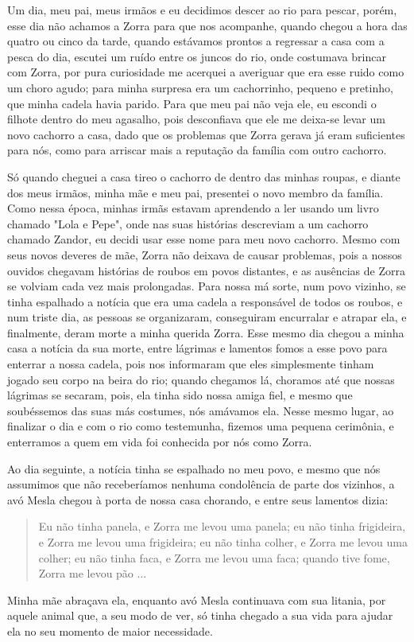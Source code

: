 Um dia, meu pai, meus irmãos e eu decidimos descer ao rio para pescar, porém, esse dia não achamos a Zorra para que nos acompanhe, quando chegou a hora das quatro ou cinco da tarde, quando estávamos prontos a regressar a casa com a pesca do dia, escutei um ruído entre os juncos do rio, onde costumava brincar com Zorra, por pura curiosidade me acerquei a averiguar que era esse ruido como um choro agudo; para minha surpresa era um cachorrinho, pequeno e pretinho, que minha cadela havia parido.  
Para que meu pai não veja ele, eu escondi o filhote dentro do meu agasalho, pois desconfiava que ele me deixa-se levar um novo cachorro a casa, dado que os problemas que Zorra gerava já eram suficientes para nós, como para arriscar mais a reputação da família com outro cachorro.

Só quando cheguei a casa tireo o cachorro de dentro das minhas roupas, e diante dos meus irmãos, minha mãe e meu pai, presentei o novo membro da família. Como nessa época, minhas irmãs estavam aprendendo a ler usando um livro chamado "Lola e Pepe", onde nas suas histórias descreviam a um cachorro chamado Zandor, eu decidi usar esse nome para meu novo cachorro. 
Mesmo com seus novos deveres de mãe, Zorra não deixava de causar problemas, pois a nossos ouvidos chegavam histórias de roubos em povos distantes, e as ausências de Zorra se volviam cada vez mais prolongadas.
Para nossa má sorte, num povo vizinho, se tinha espalhado a notícia que era uma cadela a responsável de todos os roubos, e num triste dia, as pessoas se organizaram, conseguiram encurralar e atrapar ela, e finalmente, deram morte a minha querida Zorra.
Esse mesmo dia chegou a minha casa a notícia da sua morte, entre lágrimas e lamentos fomos a esse povo para enterrar a nossa cadela, pois nos informaram que eles simplesmente tinham jogado seu corpo na beira do rio; quando chegamos lá, choramos até que nossas lágrimas se secaram, pois, ela tinha sido nossa amiga fiel, e mesmo que soubéssemos das suas más costumes, nós amávamos ela.
Nesse mesmo lugar, ao finalizar o dia e com o rio como testemunha, fizemos uma pequena cerimônia, e enterramos a quem em vida foi conhecida por nós como Zorra.

Ao dia seguinte, a notícia tinha se espalhado no meu povo, e mesmo que nós assumimos que não receberíamos nenhuma condolência de parte dos vizinhos, a avó Mesla chegou à porta de nossa casa chorando, e entre seus lamentos dizia:
\begin{quotation}
Eu não tinha panela, e Zorra me levou uma panela; 
eu não tinha frigideira, e Zorra me levou uma frigideira; 
eu não tinha colher, e Zorra me levou uma colher;
eu não tinha faca, e Zorra me levou uma faca;
quando tive fome, Zorra me levou pão ...  
\end{quotation}
Minha mãe abraçava ela, enquanto avó Mesla continuava com sua litania, por aquele animal que, a seu modo de ver, só tinha chegado a sua vida para ajudar ela no seu momento de maior necessidade.
 

